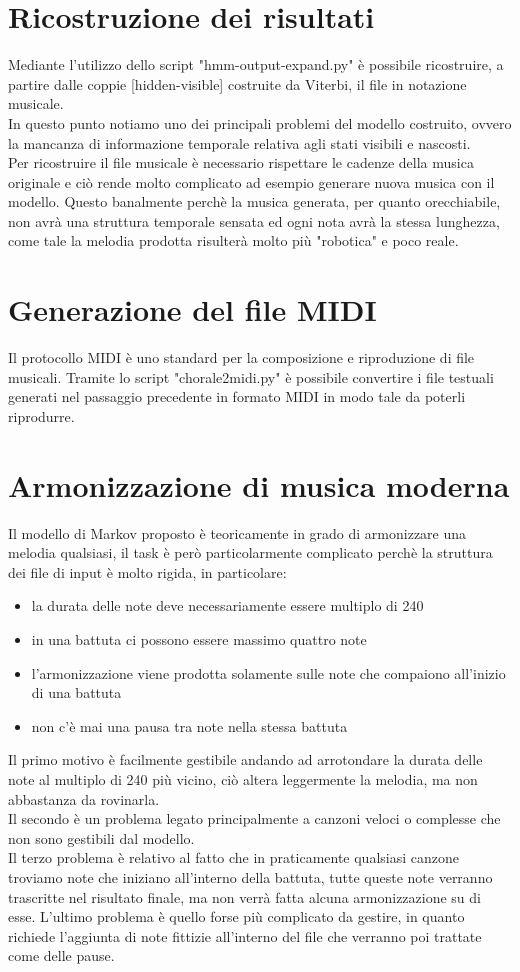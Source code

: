 \section{Ricostruzione dei risultati}
Mediante l'utilizzo dello script "hmm-output-expand.py" è possibile ricostruire, a partire dalle coppie [hidden-visible] costruite da Viterbi, il file in notazione musicale.\\
In questo punto notiamo uno dei principali problemi del modello costruito, ovvero la mancanza di informazione temporale relativa agli stati visibili e nascosti. \\
Per ricostruire il file musicale è necessario rispettare le cadenze della musica originale e ciò rende molto complicato ad esempio generare nuova musica con il modello. Questo banalmente perchè la musica generata, per quanto orecchiabile, non avrà una struttura temporale sensata ed ogni nota avrà la stessa lunghezza, come tale la melodia prodotta risulterà molto più "robotica" e poco reale.
\section{Generazione del file MIDI}
Il protocollo MIDI è uno standard per la composizione e riproduzione di file musicali. Tramite lo script "chorale2midi.py" è possibile convertire i file testuali generati nel passaggio precedente in formato MIDI in modo tale da poterli riprodurre. \\
\section{Armonizzazione di musica moderna}
Il modello di Markov proposto è teoricamente in grado di armonizzare una melodia qualsiasi, il task è però particolarmente complicato perchè la struttura dei file di input è molto rigida, in particolare:
\begin{itemize}
\item la durata delle note deve necessariamente essere multiplo di 240
\item in una battuta ci possono essere massimo quattro note
\item l'armonizzazione viene prodotta solamente sulle note che compaiono all'inizio di una battuta
\item non c'è mai una pausa tra note nella stessa battuta
\end{itemize} 
Il primo motivo è facilmente gestibile andando ad arrotondare la durata delle note al multiplo di 240 più vicino, ciò altera leggermente la melodia, ma non abbastanza da rovinarla.\\
Il secondo è un problema legato principalmente a canzoni veloci o complesse che non sono gestibili dal modello. \\
Il terzo problema è relativo al fatto che in praticamente qualsiasi canzone troviamo note che iniziano all'interno della battuta, tutte queste note verranno trascritte nel risultato finale, ma non verrà fatta alcuna armonizzazione su di esse.
L'ultimo problema è quello forse più complicato da gestire, in quanto richiede l'aggiunta di note fittizie all'interno del file che verranno poi trattate come delle pause.